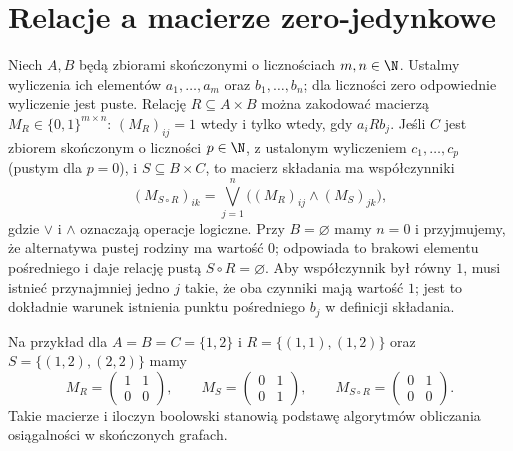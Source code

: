\section{Relacje a macierze zero-jedynkowe}
\label{sec:relation-matrices}
\begin{przyklad}
Niech $A,B$ będą zbiorami skończonymi o licznościach
$m,n\in\N$. Ustalmy wyliczenia ich elementów
$a_1,\ldots,a_m$ oraz $b_1,\ldots,b_n$; dla liczności
zero odpowiednie wyliczenie jest puste. Relację
$R\subseteq A\times B$ można zakodować macierzą
$M_R\in\{0,1\}^{m\times n}$:
$(M_R)_{ij}=1$ wtedy i tylko wtedy, gdy $a_iRb_j$.
Jeśli $C$ jest zbiorem skończonym o liczności $p\in\N$,
z ustalonym wyliczeniem $c_1,\ldots,c_p$ (pustym dla $p=0$),
i $S\subseteq B\times C$, to macierz składania
ma współczynniki
\[
(M_{S\circ R})_{ik}
=\bigvee_{j=1}^{n}\bigl((M_R)_{ij}\land(M_S)_{jk}\bigr),
\]
gdzie $\lor$ i $\land$ oznaczają operacje logiczne.
Przy $B=\varnothing$ mamy $n=0$ i przyjmujemy,
że alternatywa pustej rodziny ma wartość $0$;
odpowiada to brakowi elementu pośredniego i daje
relację pustą $S\circ R=\varnothing$.
Aby współczynnik był równy $1$, musi istnieć przynajmniej
jedno $j$ takie, że oba czynniki mają wartość $1$;
jest to dokładnie warunek istnienia punktu pośredniego
$b_j$ w definicji składania.

Na przykład dla $A=B=C=\{1,2\}$ i
$R=\{(1,1),(1,2)\}$ oraz $S=\{(1,2),(2,2)\}$ mamy
\[
M_R=\begin{pmatrix}1&1\\0&0\end{pmatrix},\qquad
M_S=\begin{pmatrix}0&1\\0&1\end{pmatrix},\qquad
M_{S\circ R}=\begin{pmatrix}0&1\\0&0\end{pmatrix}.
\]
Takie macierze i iloczyn boolowski stanowią podstawę
algorytmów obliczania osiągalności w skończonych grafach.
\end{przyklad}

